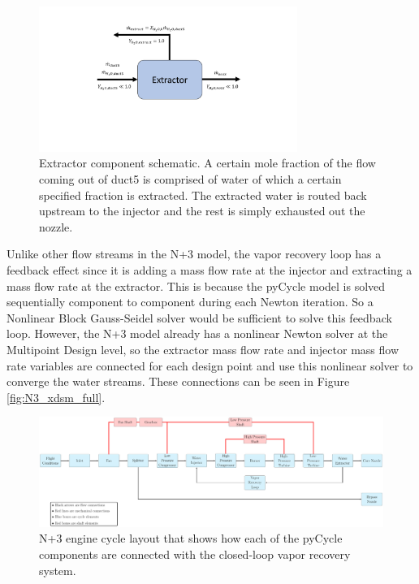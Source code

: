 \documentclass[conf]{new-aiaa}
\begin{document}
\begin{figure}[hbt!]
    \centering
    \includegraphics[width=0.75\textwidth]{extractor.pdf}
    \caption{
        Extractor component schematic.
        A certain mole fraction of the flow coming out of duct5 is comprised of water of which a certain specified fraction is extracted.
        The extracted water is routed back upstream to the injector and the rest is simply exhausted out the nozzle.
    }
    \label{fig:extractor}
\end{figure}

Unlike other flow streams in the N+3 model, the vapor recovery loop has a feedback effect since it is adding a mass flow rate at the injector and extracting a mass flow rate at the extractor.
This is because the pyCycle model is solved sequentially component to component during each Newton iteration.
So a Nonlinear Block Gauss-Seidel solver would be sufficient to solve this feedback loop.
However, the N+3 model already has a nonlinear Newton solver at the Multipoint Design level, so the extractor mass flow rate and injector mass flow rate variables are connected for each design point and use this nonlinear solver to converge the water streams.
These connections can be seen in Figure \ref{fig:N3_xdsm_full}.

\begin{figure}[hbt!]
    \centering
    \includegraphics[width=1.0\textwidth]{N3_CLVR_cycle.pdf}
    \caption{
        N+3 engine cycle layout that shows how each of the pyCycle components are connected with the closed-loop vapor recovery system. %
    }
    \label{fig:n3_clvr}
\end{figure}
\end{document}
